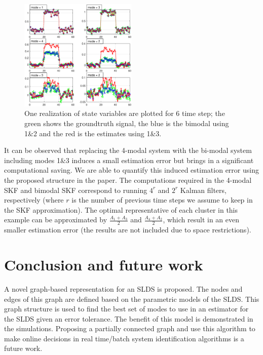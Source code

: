 \documentclass[journal]{IEEEtran}
\begin{document}
\begin{figure}
  \centering
    \includegraphics[width=0.5\textwidth]{realization.eps}
    \caption{ One realization of state variables are plotted for 6 time step; the green shows the groundtruth signal, the blue is the bimodal using 1&2 and the red is the estimates using 1&3. }
    \label{fig:rmodal}
        \vspace{-0.4cm}
\end{figure}

It can be observed that replacing the 4-modal system with the bi-modal system including modes 1&3 induces a small estimation error but brings in a significant computational saving. We are able to quantify this induced estimation error using the proposed structure in the paper. The computations required in the 4-modal SKF and bimodal SKF correspond to running $4^r$ and $2^r$ Kalman filters, respectively (where $r$ is the number of previous time steps we assume to keep in the SKF approximation). The optimal representative of each cluster in this example can be approximated by $\frac{A_1+A_3}{2}$ and $\frac{A_4+A_2}{2}$, which result in an even smaller estimation error (the results are not included due to space restrictions). 
       
\section{Conclusion and future work}\label{section:con}
A novel graph-based representation for an SLDS is proposed. The nodes and edges of this graph are defined based on the parametric models of the SLDS. This graph structure is used to find the best set of modes to use in an estimator for the SLDS given an error tolerance. The benefit of this model is demonstrated in the simulations. Proposing a partially connected graph and use this algorithm to make online decisions in real time/batch system identification algorithms is a future work. 
{}

\end{document}
